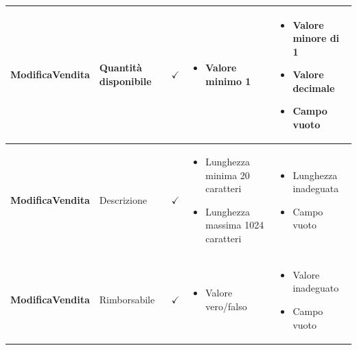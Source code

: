 \documentclass[12pt]{article}
\begin{document}
\begin{longtable}{|l|l|l|l|l|}
 \textbf{ModificaVendita} & Quantità disponibile & $\checkmark$ & \begin{minipage}{3.5cm}
 \vspace{5pt}
 \begin{itemize}
 \item Valore minimo 1
 \end{itemize}
 \vspace{5pt}
 \end{minipage} & \begin{minipage}{4cm}
 \vspace{5pt}
 \begin{itemize}
 \item Valore minore di 1
 \item Valore decimale
 \item Campo vuoto
 \end{itemize}
 \vspace{5pt}
 \end{minipage} \\ \hline
 
 \textbf{ModificaVendita} & Descrizione & $\checkmark$ & \begin{minipage}{3.5cm}
 \vspace{5pt}
 \begin{itemize}
 \item Lunghezza minima 20 caratteri
 \item Lunghezza massima 1024 caratteri
 \end{itemize}
 \vspace{5pt}
 \end{minipage} & \begin{minipage}{4cm}
 \vspace{5pt}
 \begin{itemize}
 \item Lunghezza inadeguata
 \item Campo vuoto
 \end{itemize}
 \vspace{5pt}
 \end{minipage} \\ \hline
 
 \textbf{ModificaVendita} & Rimborsabile & $\checkmark$ & \begin{minipage}{3.5cm}
 \vspace{5pt}
 \begin{itemize}
 \item Valore vero/falso
 \end{itemize}
 \vspace{5pt}
 \end{minipage} & \begin{minipage}{4cm}
 \vspace{5pt}
 \begin{itemize}
 \item Valore inadeguato
 \item Campo vuoto
 \end{itemize}
 \vspace{5pt}
 \end{minipage} \\ \hline
 

\end{longtable}
\end{document}
